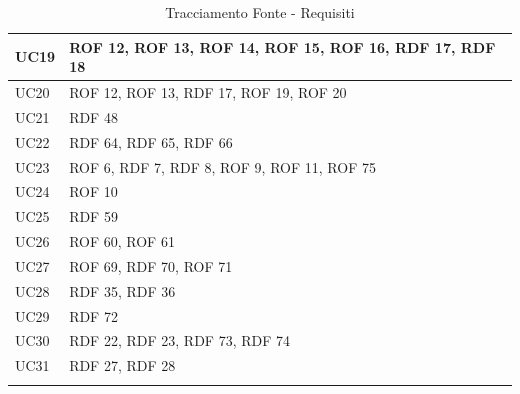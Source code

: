 \documentclass[12pt, oneside]{article}
\begin{document}
\begin{longtable}{|p{4cm}|p{12cm}|}
    \hline
    UC19 & ROF 12, ROF 13, ROF 14, ROF 15, ROF 16, RDF 17, RDF 18 \\
    \hline
    UC20 & ROF 12, ROF 13, RDF 17, ROF 19, ROF 20\\
    \hline
    UC21 & RDF 48 \\
    \hline
    UC22 & RDF 64, RDF 65, RDF 66 \\
    \hline
    UC23 & ROF 6, RDF 7, RDF 8, ROF 9, ROF 11, ROF 75\\
    \hline
    UC24 & ROF 10\\
    \hline
    UC25 & RDF 59 \\
    \hline
    UC26 & ROF 60, ROF 61 \\
    \hline
    UC27 & ROF 69, RDF 70, ROF 71 \\
    \hline
    UC28 & RDF 35, RDF 36 \\
    \hline
    UC29 & RDF 72 \\
    \hline
    UC30 & RDF 22, RDF 23, RDF 73, RDF 74 \\
    \hline
    UC31 & RDF 27, RDF 28 \\
    \hline

\caption{Tracciamento Fonte - Requisiti}
    
\end{longtable}
\end{document}
